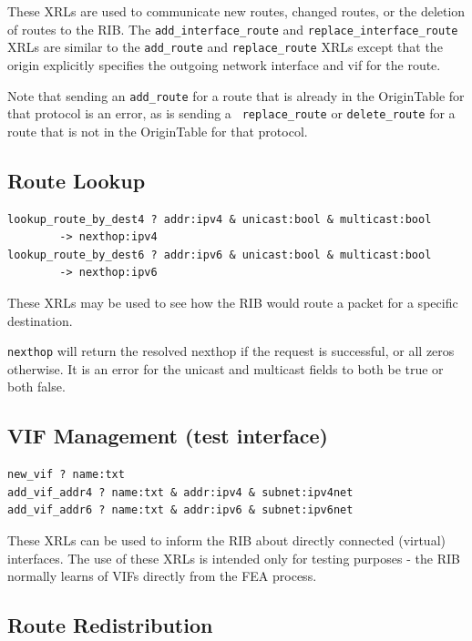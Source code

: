\documentclass[11pt]{article}
\begin{document}
These XRLs are used to communicate new routes, changed routes, or the
deletion of routes to the RIB.
The {\tt add\_interface\_route} and {\tt replace\_interface\_route}
XRLs are similar to the {\tt add\_route} and {\tt replace\_route}
XRLs except that the origin explicitly specifies the outgoing
network interface and vif for the route.

Note that sending an {\tt add\_route} for a route that is already in
the OriginTable for that protocol is an error, as is sending a {\tt
replace\_route} or {\tt delete\_route} for a route that is not in the
OriginTable for that protocol.

\subsection{Route Lookup}

\begin{verbatim}
lookup_route_by_dest4 ? addr:ipv4 & unicast:bool & multicast:bool 
        -> nexthop:ipv4
lookup_route_by_dest6 ? addr:ipv6 & unicast:bool & multicast:bool 
        -> nexthop:ipv6
\end{verbatim}

These XRLs may be used to see how the RIB would route a packet for a
specific destination.

{\tt nexthop} will return the resolved nexthop if the request is successful,
or all zeros otherwise.  It is an error for the unicast and multicast
fields to both be true or both false.

\subsection{VIF Management (test interface)}

\begin{verbatim}
new_vif ? name:txt
add_vif_addr4 ? name:txt & addr:ipv4 & subnet:ipv4net
add_vif_addr6 ? name:txt & addr:ipv6 & subnet:ipv6net
\end{verbatim}

These XRLs can be used to inform the RIB about directly connected
(virtual) interfaces.  The use of these XRLs is intended only for
testing purposes - the RIB normally learns of VIFs directly from the
FEA process.

\subsection{Route Redistribution}
\end{document}
